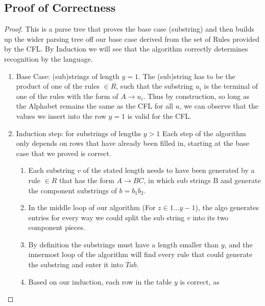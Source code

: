\documentclass{article}
\begin{document}
\subsection{Proof of Correctness}
\begin{proof}
      This is a parse tree that proves the base case (substring) and then
      builds up the wider parsing tree off our base case derived from the set of Rules
      provided by the CFL. By Induction we will see
      that the algorithm correctly determines recognition by the language.
      \begin{enumerate}
            \item Base Case: (sub)strings of length $y=1$.
                  \subitem The (sub)string has to be the product of one of the rules $\in R$,
                  such that the substring $u_i$ is the terminal of one of the rules with the
                  form of $A\rightarrow u_i$.
                  \subitem Thus by construction, so long as the Alphabet remains the same as
                  the CFL for all $u$, we can observe that the values we insert into the row
                  $y=1$ is valid for the CFL.
            \item Induction step: for substrings of lengths $y>1$
                  \subitem Each step of the algorithm only depends on rows that have already
                  been filled in, starting at the base case that we proved is correct.
                  \begin{enumerate}
                        \item Each substring $v$ of the stated length needs to have been
                              generated by a rule $\in R$ that has the form $A\rightarrow BC$,
                              in which sub strings B and generate the component substrings of $b
                                    = b_1 b_2$.
                        \item In the middle loop of our algorithm (For $z \in 1\ldots y-1$), the
                              algo generates entries for every way we could split the sub string $v$
                              into its two component pieces.
                        \item By definition the substrings must
                              have a length smaller than $y$, and the innermost loop of the
                              algorithm will find every rule that could generate the substring
                              and enter it into $Tab$.
                        \item Based on our induction, each row in the table $y$ is correct, as

\end{enumerate}
\end{enumerate}
\end{proof}
\end{document}
